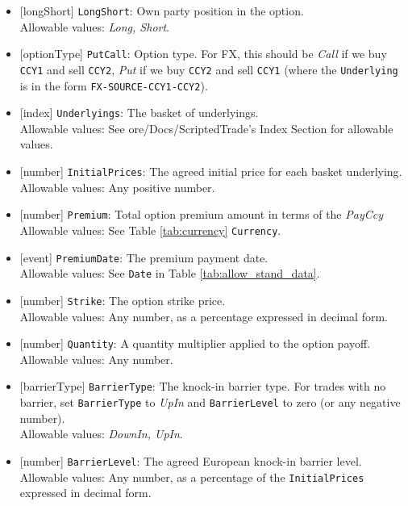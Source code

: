 \begin{itemize}
  \item{}[longShort] \lstinline!LongShort!: Own party position in the option. \\
  Allowable values: \emph{Long, Short}.
  \item{}[optionType] \lstinline!PutCall!: Option type. For FX, this should be \emph{Call} if we buy
  \lstinline!CCY1! and sell \lstinline!CCY2!,
  \emph{Put} if we buy \lstinline!CCY2! and sell \lstinline!CCY1! (where the \lstinline!Underlying! is in the
  form \lstinline!FX-SOURCE-CCY1-CCY2!). \\
  \item{}[index] \lstinline!Underlyings!: The basket of underlyings. \\
  Allowable values: See ore/Docs/ScriptedTrade's Index Section for allowable values.
  \item{}[number] \lstinline!InitialPrices!: The agreed initial price for each basket underlying. \\
  Allowable values: Any positive number.
  \item{}[number] \lstinline!Premium!: Total option premium amount in terms of the \emph{PayCcy} \\
  Allowable values: See Table \ref{tab:currency} \lstinline!Currency!.
  \item{}[event] \lstinline!PremiumDate!: The premium payment date. \\
  Allowable values: See \lstinline!Date! in Table \ref{tab:allow_stand_data}.
  \item{}[number] \lstinline!Strike!: The option strike price. \\
  Allowable values: Any number, as a percentage expressed in decimal form.
  \item{}[number] \lstinline!Quantity!: A quantity multiplier applied to the option payoff. \\
  Allowable values: Any number.
  \item{}[barrierType] \lstinline!BarrierType!: The knock-in barrier type. For trades with no barrier,
  set \lstinline!BarrierType! to \emph{UpIn} and \lstinline!BarrierLevel! to zero (or any negative number). \\
  Allowable values: \emph{DownIn, UpIn}.
  \item{}[number] \lstinline!BarrierLevel!: The agreed European knock-in barrier level. \\
  Allowable values: Any number, as a percentage of the \lstinline!InitialPrices! expressed in decimal form.

\end{itemize}
